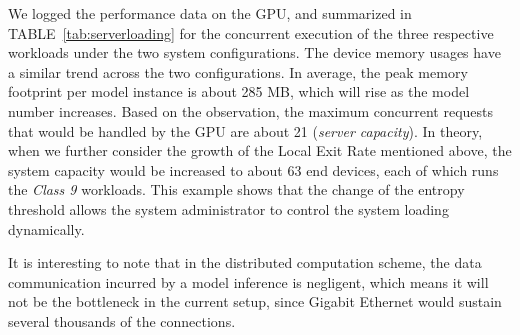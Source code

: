 \documentclass[format=acmsmall, review=false, screen=true]{acmart}
\def\tablename{TABLE}
\begin{document}
We logged the performance data on the GPU, and summarized in \tablename~\ref{tab:serverloading} for the concurrent execution of the three respective workloads under the two system configurations.
The device memory usages have a similar trend across the two configurations. In average, the peak memory footprint per model instance is about 285 MB, which will rise as the model number increases. Based on the observation, the maximum concurrent requests that would be handled by the GPU are about 21 (\emph{server capacity}).
In theory, when we further consider the growth of the Local Exit Rate mentioned above, the system capacity would be increased to about 63 end devices, each of which runs the \emph{Class 9} workloads.
This example shows that the change of the entropy threshold allows the system administrator to control the system loading dynamically.



It is interesting to note that in the distributed computation scheme, the data communication incurred by a model inference is negligent, which means it will not be the bottleneck in the current setup, since Gigabit Ethernet would sustain several thousands of the connections.
\end{document}
